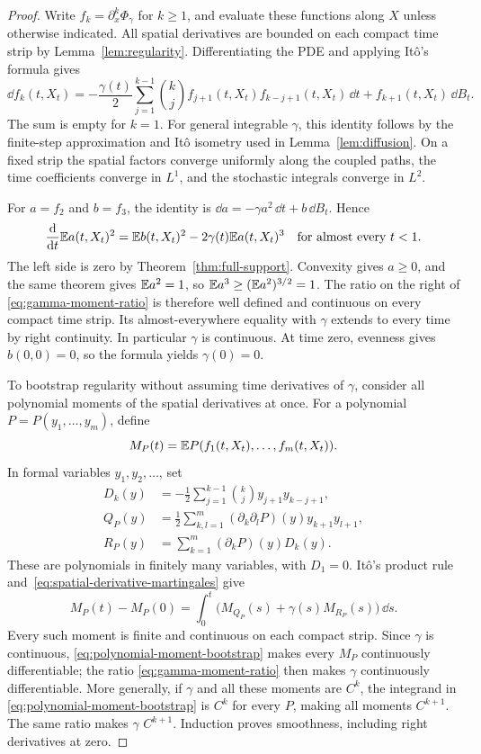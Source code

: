 \begin{proof}
Write $f_k=\partial_x^k\Phi_\gamma$ for $k\geq1$, and evaluate these
functions along $X$ unless otherwise indicated. All spatial derivatives
are bounded on each compact time strip by Lemma~\ref{lem:regularity}.
Differentiating the PDE and applying It\^o's formula gives
\begin{equation}\label{eq:spatial-derivative-martingales}
 \dd f_k(t,X_t)
 =-\frac{\gamma(t)}2\sum_{j=1}^{k-1}\binom{k}{j}
       f_{j+1}(t,X_t)f_{k-j+1}(t,X_t)\,\dd t
       +f_{k+1}(t,X_t)\,\dd B_t.
\end{equation}
The sum is empty for $k=1$. For general integrable $\gamma$, this
identity follows by the finite-step approximation and It\^o isometry
used in Lemma~\ref{lem:diffusion}. On a fixed strip the spatial
factors converge uniformly along the coupled paths, the time coefficients
converge in $L^1$, and the stochastic integrals converge in $L^2$.

For $a=f_2$ and $b=f_3$, the identity is
$\dd a=-\gamma a^2\,\dd t+b\,\dd B_t$. Hence
\[
 \frac{\mathrm d}{\mathrm d t}\mathbb E a(t,X_t)^2
 =\mathbb E b(t,X_t)^2-2\gamma(t)\mathbb E a(t,X_t)^3
 \quad\hbox{for almost every }t<1.
\]
The left side is zero by Theorem~\ref{thm:full-support}. Convexity gives
$a\geq0$, and the same theorem gives $\mathbb E a^2=1$, so
$\mathbb E a^3\geq(\mathbb E a^2)^{3/2}=1$. The ratio on the right of
\eqref{eq:gamma-moment-ratio} is therefore well defined and continuous
on every compact time strip. Its almost-everywhere equality with
$\gamma$ extends to every time by right continuity. In particular
$\gamma$ is continuous. At time zero, evenness gives $b(0,0)=0$,
so the formula yields $\gamma(0)=0$.

To bootstrap regularity without assuming time derivatives of $\gamma$,
consider all polynomial moments of the spatial derivatives at once.
For a polynomial $P=P(y_1,\ldots,y_m)$, define
\[
 M_P(t)=\mathbb E P(f_1(t,X_t),\ldots,f_m(t,X_t)).
\]
In formal variables $y_1,y_2,\ldots$, set
\[
 \begin{aligned}
 D_k(y)&=-\frac12\sum_{j=1}^{k-1}\binom{k}{j}
                           y_{j+1}y_{k-j+1},\\
 Q_P(y)&=\frac12\sum_{k,l=1}^m
              (\partial_k\partial_lP)(y)y_{k+1}y_{l+1},\\
 R_P(y)&=\sum_{k=1}^m(\partial_kP)(y)D_k(y).
 \end{aligned}
\]
These are polynomials in finitely many variables, with $D_1=0$.
It\^o's product rule and~\eqref{eq:spatial-derivative-martingales} give
\begin{equation}\label{eq:polynomial-moment-bootstrap}
 M_P(t)-M_P(0)=\int_0^t
       \bigl(M_{Q_P}(s)+\gamma(s)M_{R_P}(s)\bigr)\,\dd s.
\end{equation}
Every such moment is finite and continuous on each compact strip.
Since $\gamma$ is continuous, \eqref{eq:polynomial-moment-bootstrap}
makes every $M_P$ continuously differentiable; the ratio
\eqref{eq:gamma-moment-ratio} then makes $\gamma$ continuously
differentiable. More generally, if $\gamma$ and all these moments are
$C^k$, the integrand in \eqref{eq:polynomial-moment-bootstrap} is $C^k$
for every $P$, making all moments $C^{k+1}$. The same ratio makes
$\gamma$ $C^{k+1}$. Induction proves smoothness, including right
derivatives at zero.


\end{proof}
